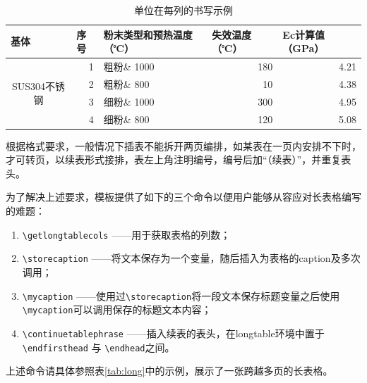 \begin{table}[htbp]
  \centering
  \caption{单位在每列的书写示例}\label{tab:demo}
    \begin{tabular}{crlrr}
    \toprule
    \multicolumn{1}{l}{基体} & \multicolumn{1}{l}{序号} & 粉末类型和预热温度（℃） & \multicolumn{1}{l}{失效温度（℃）} & \multicolumn{1}{l}{Ec计算值（GPa）} \\
    \midrule
    \multirow{4}[2]{*}{SUS304不锈钢} & 1     & 粗粉\& 1000 & 180   & 4.21 \\
          & 2     & 粗粉\& 800 & 10    & 4.38 \\
          & 3     & 细粉\& 1000 & 300   & 4.95 \\
          & 4     & 细粉\& 800 & 120   & 5.08 \\
    \bottomrule
    \end{tabular}%
  \label{tab:addlabel}%
\end{table}%

根据格式要求，一般情况下插表不能拆开两页编排，如某表在一页内安排不下时，才可转页，以续表形式接排，表左上角注明编号，编号后加“（续表）”，并重复表头。

为了解决上述要求，模板提供了如下的三个命令以便用户能够从容应对长表格编写的难题：

\begin{enumerate}
    \item \texttt{\textbackslash getlongtablecols} ——用于获取表格的列数；
    \item \texttt{\textbackslash storecaption} ——将文本保存为一个变量，随后插入为表格的caption及多次调用；
    \item \texttt{\textbackslash mycaption} ——使用过\texttt{\textbackslash storecaption}将一段文本保存标题变量之后使用\texttt{\textbackslash mycaption}可以调用保存的标题文本内容；
    \item \texttt{\textbackslash continuetablephrase} ——插入续表的表头，在longtable环境中置于\texttt{\textbackslash endfirsthead} 与 \texttt{\textbackslash endhead}之间。
\end{enumerate}

上述命令请具体参照表\ref{tab:long}中的示例，展示了一张跨越多页的长表格\autocite{2024lnmcm}。

